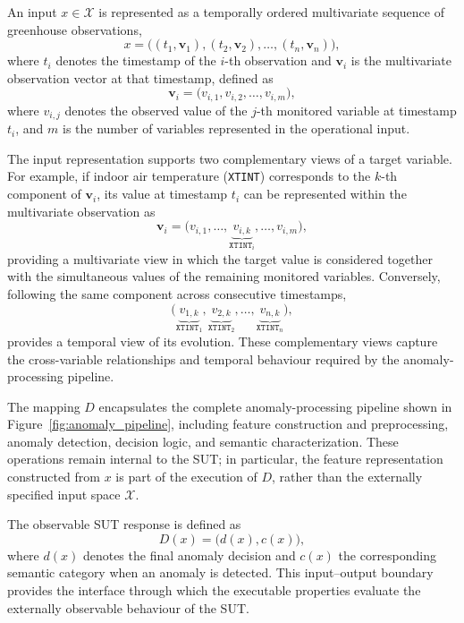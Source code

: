 \documentclass[preprint,12pt]{elsarticle}
\begin{document}
An input \(x\in\mathcal{X}\) is represented as a temporally ordered
multivariate sequence of greenhouse observations,
\begin{equation}
    x =
    \bigl(
        (t_1,\mathbf{v}_1),
        (t_2,\mathbf{v}_2),
        \ldots,
        (t_n,\mathbf{v}_n)
    \bigr),
    \label{eq:sut_input}
\end{equation}
where \(t_i\) denotes the timestamp of the \(i\)-th observation and
\(\mathbf{v}_i\) is the multivariate observation vector at that timestamp,
defined as
\begin{equation}
    \mathbf{v}_i =
    \bigl(
        v_{i,1}, v_{i,2}, \ldots, v_{i,m}
    \bigr),
    \label{eq:sut_observation}
\end{equation}
where \(v_{i,j}\) denotes the observed value of the \(j\)-th monitored
variable at timestamp \(t_i\), and \(m\) is the number of variables
represented in the operational input.

The input representation supports two complementary views of a target
variable. For example, if indoor air temperature (\texttt{XTINT}) corresponds
to the \(k\)-th component of \(\mathbf{v}_i\), its value at timestamp \(t_i\)
can be represented within the multivariate observation as
$$
    \mathbf{v}_i =
    \bigl(
        v_{i,1},\ldots,
        \underbrace{v_{i,k}}_{\texttt{XTINT}_i},
        \ldots,v_{i,m}
    \bigr),
$$
providing a multivariate view in which the target value is considered
together with the simultaneous values of the remaining monitored variables.
Conversely, following the same component across consecutive timestamps,
$$
    \bigl(
        \underbrace{v_{1,k}}_{\texttt{XTINT}_1},
        \underbrace{v_{2,k}}_{\texttt{XTINT}_2},
        \ldots,
        \underbrace{v_{n,k}}_{\texttt{XTINT}_n}
    \bigr),
$$
provides a temporal view of its evolution. These complementary views capture
the cross-variable relationships and temporal behaviour required by the
anomaly-processing pipeline.

The mapping \(D\) encapsulates the complete anomaly-processing pipeline shown
in Figure~\ref{fig:anomaly_pipeline}, including feature construction and
preprocessing, anomaly detection, decision logic, and semantic
characterization. These operations remain internal to the SUT; in particular,
the feature representation constructed from \(x\) is part of the execution of
\(D\), rather than the externally specified input space \(\mathcal{X}\).

The observable SUT response is defined as
\begin{equation}
    D(x) =
    \bigl(
        d(x), c(x)
    \bigr),
    \label{eq:sut_output}
\end{equation}
where \(d(x)\) denotes the final anomaly decision and \(c(x)\) the
corresponding semantic category when an anomaly is detected. This
input--output boundary provides the interface through which the executable
properties evaluate the externally observable behaviour of the SUT.
\end{document}
